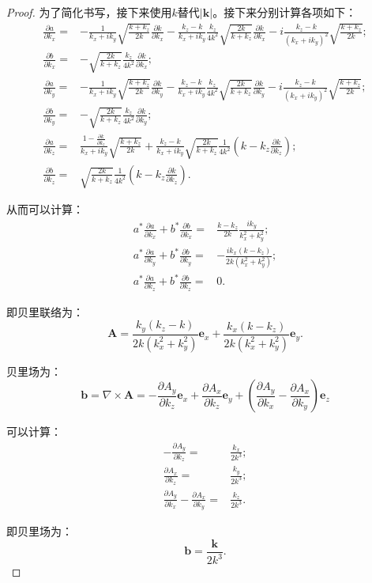 \documentclass[reqno,a4paper,12pt]{amsart}
\begin{document}
\begin{enumerate}[1.]
\begin{proof}
为了简化书写，接下来使用$k$替代$\vert \mathbf{k} \vert$。接下来分别计算各项如下：
\begin{align*}
	\frac{\partial a}{\partial k_x} =&-\frac{1}{k_x+ik_y} \sqrt{\frac{k+k_z}{2k}} \frac{\partial k}{\partial k_x} - \frac{k_z-k}{k_x+ik_y}\frac{k_z}{4k^2}\sqrt{\frac{2k}{k+k_z}} \frac{\partial k}{\partial k_x} - i\frac{k_z-k}{(k_x+ik_y)^2}\sqrt{\frac{k+k_z}{2k}}; \\
	\frac{\partial b}{\partial k_x} =& -\sqrt{\frac{2k}{k+k_z}} \frac{k_z}{4k^2} \frac{\partial k}{\partial k_x}; \\
	\frac{\partial a}{\partial k_y} =& -\frac{1}{k_x+ik_y} \sqrt{\frac{k+k_z}{2k}} \frac{\partial k}{\partial k_y} - \frac{k_z-k}{k_x+ik_y}\frac{k_z}{4k^2}\sqrt{\frac{2k}{k+k_z}} \frac{\partial k}{\partial k_y} - i\frac{k_z-k}{(k_x+ik_y)^2}\sqrt{\frac{k+k_z}{2k}};\\
	\frac{\partial b}{\partial k_y} =& -\sqrt{\frac{2k}{k+k_z}} \frac{k_z}{4k^2} \frac{\partial k}{\partial k_y};\\
	\frac{\partial a}{\partial k_z} =& \frac{1-\frac{\partial k}{\partial k_z}}{k_x+ik_y} \sqrt{\frac{k+k_z}{2k}} + \frac{k_z-k}{k_x+ik_y} \sqrt{\frac{2k}{k+k_z}} \frac{1}{4k^2} \left( k-k_z\frac{\partial k}{\partial k_z} \right);\\
	\frac{\partial b}{\partial k_z} =& \sqrt{\frac{2k}{k+k_z}} \frac{1}{4k^2} \left( k-k_z\frac{\partial k}{\partial k_z} \right).
\end{align*}

从而可以计算：
\begin{align*}
	a^* \frac{\partial a}{\partial k_x} + b^* \frac{\partial b}{\partial k_x} =& \frac{k-k_z}{2k} \frac{ik_y}{k_x^2+k_y^2}; \\
	a^* \frac{\partial a}{\partial k_y} + b^* \frac{\partial b}{\partial k_y} =& -\frac{ik_x(k-k_z)}{2k(k_x^2+k_y^2)}; \\
	a^* \frac{\partial a}{\partial k_z} + b^* \frac{\partial b}{\partial k_z} =& 0.
\end{align*}

即贝里联络为：
\[
	\mathbf{A} = \frac{k_y(k_z-k)}{2k(k_x^2+k_y^2)} \mathbf{e}_x + \frac{k_x(k-k_z)}{2k(k_x^2+k_y^2)} \mathbf{e}_y.
\]

贝里场为：
\[
	\mathbf{b} = \nabla \times \mathbf{A} = -\frac{\partial A_y}{\partial k_z} \mathbf{e}_x + \frac{\partial A_x}{\partial k_z} \mathbf{e}_y + \left( \frac{\partial A_y}{\partial k_x} - \frac{\partial A_x}{\partial k_y} \right) \mathbf{e}_z
\]

可以计算：
\begin{align*}
	-\frac{\partial A_y}{\partial k_z} =& \frac{k_x}{2k^3}; \\
	\frac{\partial A_x}{\partial k_z} =& \frac{k_y}{2k^3}; \\
	\frac{\partial A_y}{\partial k_x} - \frac{\partial A_x}{\partial k_y} =& \frac{k_z}{2k^3}.
\end{align*}

即贝里场为：
\[
	\mathbf{b} = \frac{\mathbf{k}}{2k^3}.
\]

\end{proof}



\end{enumerate}
\end{document}
